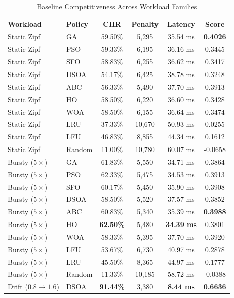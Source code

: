 \documentclass[10pt,journal,compsoc]{IEEEtran}
\begin{document}
\begin{table}[htbp]
\centering
\caption{Baseline Competitiveness Across Workload Families}
\label{tab:rq7}
\begin{tabular}{llcccc}
\toprule
\textbf{Workload} & \textbf{Policy} & \textbf{CHR} & \textbf{Penalty} & \textbf{Latency} & \textbf{Score} \\
\midrule
Static Zipf & GA     & 59.50\% & 5,295 & 35.54 ms & \textbf{0.4026} \\
Static Zipf & PSO    & 59.33\% & 6,195 & 36.16 ms & 0.3445 \\
Static Zipf & SFO    & 58.83\% & 6,255 & 36.62 ms & 0.3417 \\
Static Zipf & DSOA   & 54.17\% & 6,425 & 38.78 ms & 0.3248 \\
Static Zipf & ABC    & 56.33\% & 5,490 & 37.70 ms & 0.3913 \\
Static Zipf & HO     & 58.50\% & 6,220 & 36.60 ms & 0.3428 \\
Static Zipf & WOA    & 58.50\% & 6,155 & 36.64 ms & 0.3474 \\
Static Zipf & LRU    & 37.33\% & 10,670 & 50.93 ms & 0.0255 \\
Static Zipf & LFU    & 46.83\% & 8,855 & 44.34 ms & 0.1612 \\
Static Zipf & Random & 11.00\% & 10,780 & 60.07 ms & -0.0658 \\
\midrule
Bursty ($5\times$) & GA     & 61.83\% & 5,550 & 34.71 ms & 0.3864 \\
Bursty ($5\times$) & PSO    & 62.33\% & 5,475 & 34.53 ms & 0.3913 \\
Bursty ($5\times$) & SFO    & 60.17\% & 5,450 & 35.90 ms & 0.3908 \\
Bursty ($5\times$) & DSOA   & 58.50\% & 5,520 & 37.57 ms & 0.3852 \\
Bursty ($5\times$) & ABC    & 60.83\% & 5,340 & 35.39 ms & \textbf{0.3988} \\
Bursty ($5\times$) & HO     & \textbf{62.50\%} & 5,480 & \textbf{34.39 ms} & 0.3801 \\
Bursty ($5\times$) & WOA    & 58.33\% & 5,395 & 37.70 ms & 0.3920 \\
Bursty ($5\times$) & LFU    & 53.67\% & 6,730 & 40.97 ms & 0.2878 \\
Bursty ($5\times$) & LRU    & 45.50\% & 8,365 & 44.97 ms & 0.1777 \\
Bursty ($5\times$) & Random & 11.33\% & 10,185 & 58.72 ms & -0.0388 \\
\midrule
Drift ($0.8\to1.6$) & DSOA   & \textbf{91.44\%} & 3,380 & \textbf{8.44 ms} & \textbf{0.6636} \\

\end{tabular}
\end{table}
\end{document}
